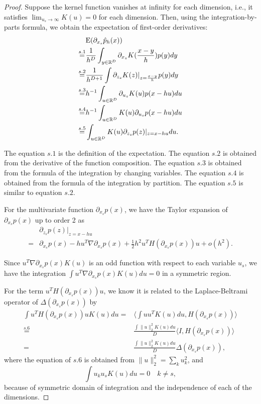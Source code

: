 \documentclass[aos,preprint]{imsart}
\theoremstyle{remark}
\begin{document}
\begin{appendix}
\begin{proof}
Suppose the kernel function vanishes at infinity for each dimension, i.e., it satisfies $\lim_{u_s\rightarrow \infty}K(u)=0$ for each dimension. Then, using the integration-by-parts formula, we obtain the expectation of first-order derivatives:
\begin{equation}\label{Expectation}
\begin{aligned}
&{\rm E} (\partial_{x_s} \hat{p}_h(x)) \\
\overset{s.1}{=}& \frac{1}{h^D} \int_{y\in \mathbb{R}^D}{\partial_{x_s}}  K(\frac{x-y}{h}) p(y) dy  \\
\overset{s.2}{=}&\frac{1}{h^{D+1}}\int \partial_{z_s} K(z)|_{z=\frac{x-y}{h}} p(y) dy\\
\overset{s.3}{=}&h^{-1} \int_ {u\in \mathbb{R}^D} \partial_{u_s} K(u) p(x-hu)  d u\\
\overset{s.4}{=}&h^{-1}\int_ {u\in \mathbb{R}^D} K(u) \partial_{u_s} p(x-hu) d u \\
\overset{s.5}{=}& \int_ {u\in \mathbb{R}^D} K(u) \partial_{z_s}p(z)|_{z=x-hu} d u.
\end{aligned}
\end{equation}

The equation $s.1$ is the definition of the expectation. The equation $s.2$ is obtained from the derivative of the function composition. The equation $s.3$ is obtained from the formula of the integration by changing variables. The equation $s.4$ is obtained from the formula of the integration by partition. The equation $s.5$ is similar to equation $s.2$.

For the multivariate function $\partial_{x_s} p(x)$, we have the Taylor expansion of $\partial_{x_s} p(x)$ up to order 2 as
\begin{equation}\label{Taylor}
\begin{aligned}
&\partial_{z_s} p(z)|_{z=x-hu}\\
= &\partial_{x_s} p(x) -  h u^T\nabla \partial_{x_s} p(x) + \frac{1}{2}h^2 u^T H(\partial_{x_s}p(x))u + o(h^2).
\end{aligned}
\end{equation}

Since $u^T \nabla \partial_{x_s} p(x) K(u)$ is an odd function with respect to each variable $u_s$, we have the integration $\int u^T \nabla \partial_{x_s} p(x) K(u) du = 0 $ in a symmetric region. 

For the term $u^T H(\partial_{x_s}p(x))u$, we know it is related to the Laplace-Beltrami operator of $\Delta(\partial_{x_s}p(x))$ by
\[
\begin{aligned}
\int u^T H(\partial_{x_s}p(x))u K(u) du =& \langle \int uu^TK(u) du, H(\partial_{x_s}p(x))\rangle\\
\overset{s.6}{=}&\frac{\int \|u\|_2^2K(u)du}{D} \langle  I, H(\partial_{x_s}p(x))\rangle\\
=&\frac{\int \|u\|_2^2K(u)du}{D} \Delta(\partial_{x_s}p(x)),
\end{aligned}
\]
where the equation of $s.6$ is obtained from $\|u\|_2^2 = \sum_k u^2_k$, and
\[
\int u_k u_s K(u)du=0 \quad k\neq s,
\] because of symmetric domain of integration and the independence  of each of the dimensions. 


\end{proof}
\end{appendix}
\end{document}
